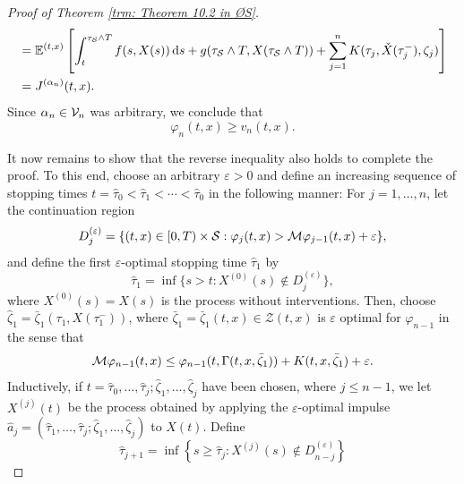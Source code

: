 \begin{proof}[Proof of Theorem \ref{trm: Theorem 10.2 in ØS}]
\begin{align}
        & = \mathbb{E}^{(t,x)} \left[ \int_t^{\tau_{\mathcal{S}} \wedge T} f(s,X(s)) \,\mathrm{d} s + g(\tau_{\mathcal{S}} \wedge T,X(\tau_{\mathcal{S}} \wedge T))+ \sum_{j=1}^n K(\tau_j,\check{X}(\tau_j^-),\zeta_j) \right] \nonumber \\
        &= J^{(\alpha_n)}(t,x).
        \label{eqn: (10.1.27) in ØS}
    \end{align}
    Since $\alpha_n \in \mathcal{V}_n$ was arbitrary, we conclude that 
    \begin{equation}
        \varphi_n(t,x) \geq v_n(t,x). 
        \label{eqn: (10.1.28) in ØS}
    \end{equation}

    It now remains to show that the reverse inequality also holds to complete the proof. To this end, choose an arbitrary $\varepsilon >0$ and define an increasing sequence of stopping times $t=\hat{\tau}_0 < \hat{\tau}_1 < \cdots < \hat{\tau}_0$ in the following manner: For $j=1,\ldots,n$, let the continuation region 
    \begin{equation}
        D_j^{(\varepsilon)} = \{ (t,x) \in [0,T) \times \mathcal{S}: \varphi_j(t,x) > \mathcal{M} \varphi_{j-1}(t,x) + \varepsilon \},
        \label{eqn: (10.1.29) in ØS}
    \end{equation}
    and define the first $\varepsilon$-optimal stopping time $\hat{\tau}_1$ by
    \begin{equation}
        \hat{\tau}_1 = \inf \{ s > t: X^{(0)}(s) \notin D_j^{(\varepsilon)} \},
        \label{eqn: (10.1.30) in ØS}
    \end{equation}
    where $X^{(0)}(s) = X(s)$ is the process without interventions. Then, choose $\hat{\zeta}_1 = \bar{\zeta}_1(\tau_1, X(\tau_1^-))$, where $\bar{\zeta}_1 = \bar{\zeta}_1(t, x) \in \mathcal{Z}(t,x)$ is $\varepsilon$ optimal for $\varphi_{n-1}$ in the sense that 
    \begin{equation}
        \mathcal{M} \varphi_{n-1}(t,x) \leq \varphi_{n-1}(t, \Gamma(t,x, \bar{\zeta}_{1})) + K(t,x,\bar{\zeta}_{1}) + \varepsilon.
        \label{eqn: (10.1.31) in ØS}
    \end{equation}
    Inductively, if $t = \hat{\tau}_0, \ldots, \hat{\tau}_j; \hat{\zeta}_1, \ldots, \hat{\zeta}_j$ have been chosen, where $j\leq n-1$, we let $X^{(j)}(t)$ be the process obtained by applying the $\varepsilon$-optimal impulse $\hat{a}_j = (\hat{\tau}_1, \ldots, \hat{\tau}_j; \hat{\zeta}_1, \ldots, \hat{\zeta}_j)$ to $X(t)$. Define 
    \begin{equation}
        \hat{\tau}_{j+1} = \inf\left\{s \geq \hat{\tau}_j: X^{(j)}(s) \notin D_{n-j}^{(\varepsilon)} \right\}

\end{equation}
\end{proof}
